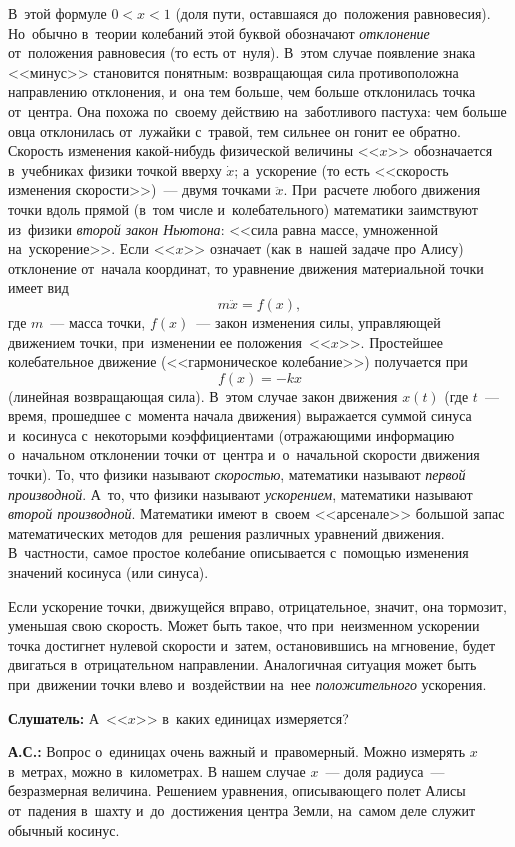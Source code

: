 В~этой формуле $0<x<1$ (доля пути, оставшаяся до~положения равновесия). Но~обычно в~теории
колебаний этой буквой обозначают \textit{отклонение} от~положения равновесия (то есть от~нуля). В~этом
случае появление знака <<минус>> становится понятным: возвращающая сила противоположна направлению
отклонения, и~она тем больше, чем больше отклонилась точка от~центра. Она похожа по~своему действию
на~заботливого пастуха: чем больше овца отклонилась от~лужайки с~травой, тем сильнее он гонит ее
обратно. Скорость изменения какой-нибудь физической величины <<$x$>> обозначается в~учебниках физики
точкой вверху $\dot x$; а~ускорение (то есть <<скорость изменения скорости>>)~--- двумя точками $\ddot x$.
При~расчете любого движения точки вдоль прямой (в~том числе и~колебательного) математики заимствуют
из~физики \textit{второй закон Ньютона}: <<сила равна массе, умноженной на~ускорение>>. Если <<$x$>> означает
(как в~нашей задаче про Алису) отклонение от~начала координат, то уравнение движения материальной
точки имеет вид $$m\ddot x=f(x),$$ где $m$~--- масса точки, $f(x)$~--- закон изменения силы, управляющей
движением точки, при~изменении ее положения~<<$x$>>. Простейшее колебательное движение
(<<гармоническое колебание>>) получается при $$f(x)=-kx$$ (линейная возвращающая сила). В~этом
случае закон движения $x(t)$ (где $t$~--- время, прошедшее с~момента начала движения) выражается суммой
синуса и~косинуса с~некоторыми коэффициентами (отражающими информацию о~начальном отклонении точки
от~центра и~о~начальной скорости движения точки). То, что физики называют \textit{скоростью}, математики
называют \textit{первой производной}. А~то, что физики называют \textit{ускорением}, математики называют \textit{второй производной}.
 Математики имеют в~своем <<арсенале>> большой запас математических методов
для~решения различных уравнений движения. В~частности, самое простое колебание описывается
с~помощью изменения значений косинуса (или синуса).

Если ускорение точки, движущейся вправо, отрицательное, значит, она тормозит, уменьшая свою
скорость. Может быть такое, что при~неизменном ускорении точка достигнет нулевой скорости и~затем,
остановившись на мгновение, будет двигаться в~отрицательном направлении.
 Аналогичная ситуация может быть
при~движении точки влево и~воздействии на~нее \textit{положительного} ускорения.

\textbf{Слушатель:} А~<<$x$>> в~каких единицах измеряется?

\textbf{А.С.:} Вопрос о~единицах очень важный и~правомерный. Можно измерять $x$ в~метрах, можно
в~километрах. В нашем случае $x$~--- доля радиуса~--- безразмерная величина.
 Решением уравнения, описывающего полет Алисы от~падения в~шахту и~до~достижения
центра Земли, на~самом деле служит обычный косинус.

